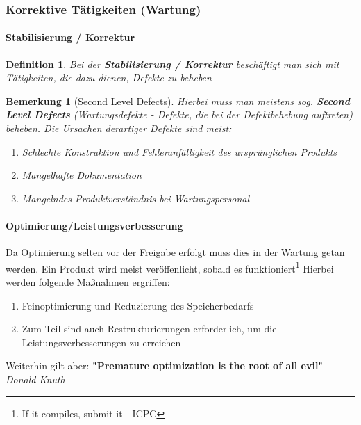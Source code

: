 \documentclass[a4paper]{article}
\theoremstyle{break}
\newtheorem{defi}{Definition}[section]
\newtheorem{ann}{Bemerkung}[section]
\begin{document}
\subsubsection{Korrektive Tätigkeiten (Wartung)}
\setcounter{secnumdepth}{4} %
\paragraph{Stabilisierung / Korrektur}
\begin{defi}
	Bei der \textbf{Stabilisierung / Korrektur} beschäftigt man sich mit Tätigkeiten, die dazu dienen, Defekte zu beheben
\end{defi}

\begin{ann}[Second Level Defects]
	Hierbei muss man meistens sog. \textbf{Second Level Defects} (\textit{Wartungsdefekte - Defekte, die bei der Defektbehebung auftreten}) beheben.
	\newline
	Die Ursachen derartiger Defekte sind meist:
	\begin{enumerate}
		\item Schlechte Konstruktion und Fehleranfälligkeit des ursprünglichen Produkts
		\item Mangelhafte Dokumentation
		\item Mangelndes Produktverständnis bei Wartungspersonal
	\end{enumerate}
\end{ann}
\paragraph{Optimierung/Leistungsverbesserung}
Da Optimierung selten vor der Freigabe erfolgt muss dies in der Wartung getan werden. Ein Produkt wird meist veröffenlicht, sobald es funktioniert\footnote{If it compiles, submit it - ICPC}\newline
Hierbei werden folgende Maßnahmen ergriffen:
\begin{enumerate}
	\item Feinoptimierung und Reduzierung des Speicherbedarfs
	\item Zum Teil sind auch Restrukturierungen erforderlich, um die Leistungsverbesserungen zu erreichen
\end{enumerate}
Weiterhin gilt aber: \textbf{"Premature optimization is the root of all evil"}\textit{ - Donald Knuth}
\end{document}
